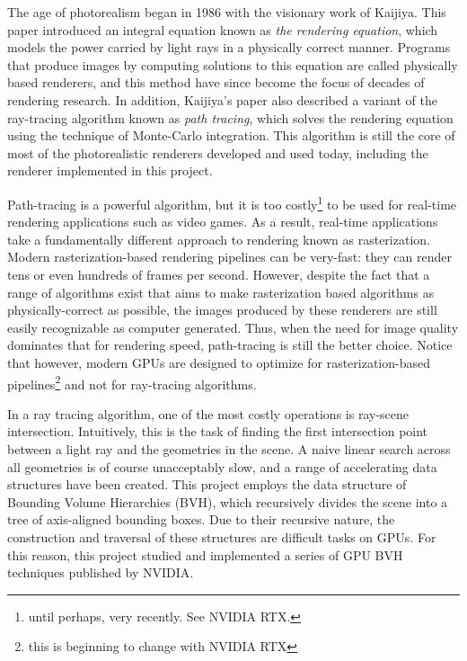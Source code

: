 The age of photorealism began in 1986 with the visionary work of Kaijiya\cite{rendering_equation}. This paper introduced an integral equation known as \textit{the rendering equation}, which models the power carried by light rays in a physically correct manner. Programs that produce images by computing solutions to this equation are called physically based renderers, and this method have since become the focus of decades of rendering research. In addition, Kaijiya's paper also described a variant of the ray-tracing algorithm known as \textit{path tracing}, which solves the rendering equation using the technique of Monte-Carlo integration. This algorithm is still the core of most of the photorealistic renderers developed and used today, including the renderer implemented in this project.

Path-tracing is a powerful algorithm, but it is too costly\footnote{until perhaps, very recently. See NVIDIA RTX.} to be used for real-time rendering applications such as video games. As a result, real-time applications take a fundamentally different approach to rendering known as rasterization. Modern rasterization-based rendering pipelines can be very-fast: they can render tens or even hundreds of frames per second. However, despite the fact that a range of algorithms\cite{fernando2005percentage}\cite{sloan2002precomputed}\cite{hanrahan1991rapid} exist that aims to make rasterization based algorithms as physically-correct as possible, the images produced by these renderers are still easily recognizable as computer generated. Thus, when the need for image quality dominates that for rendering speed, path-tracing is still the better choice. Notice that however, modern GPUs are designed to optimize for rasterization-based pipelines\footnote{this is beginning to change with NVIDIA RTX} and not for ray-tracing algorithms. 

In a ray tracing algorithm, one of the most costly operations is ray-scene intersection. Intuitively, this is the task of finding the first intersection point between a light ray and the geometries in the scene. A naive linear search across all geometries is of course unacceptably slow, and a range of accelerating data structures have been created. This project employs the data structure of Bounding Volume Hierarchies (BVH), which recursively divides the scene into a tree of axis-aligned bounding boxes. Due to their recursive nature, the construction and traversal of these structures are difficult tasks on GPUs. For this reason, this project studied and implemented a series of GPU BVH techniques published by NVIDIA\cite{bvh_build}\cite{bvh_optimize}\cite{bvh_traversal}.


